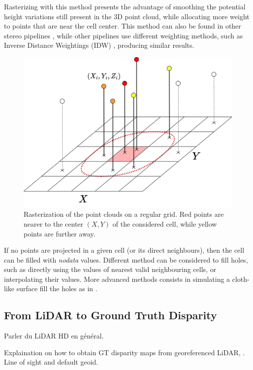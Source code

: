 Rasterizing with this method presents the advantage of smoothing the potential height variations still present in the 3D point cloud, while allocating more weight to points that are near the cell center. This method can also be found in other stereo pipelines \cite{shean_automated_2016}, while other pipelines use different weighting methods, such as Inverse Distance Weightings (IDW) \cite{rupnik_micmac_2017}, producing similar results.

\begin{figure}
    \centering
    \includegraphics[width=0.7\linewidth]{Images/Chap_1/Rasterization.png}
    \caption{Rasterization of the point clouds on a regular grid. Red points are nearer to the center $(X,Y)$ of the considered cell, while yellow points are further away.}
    \label{fig:rasterization}
\end{figure}

\begin{remark}
    If no points are projected in a given cell (or its direct neighbours), then the cell can be filled with \textit{nodata} values. Different method can be considered to fill holes, such as directly using the values of nearest valid neighbouring cells, or interpolating their values. More advanced methods consists in simulating a cloth-like surface fill the holes as in \cite{lallement_bulldozer_2022}.
\end{remark}

\subsection{From LiDAR to Ground Truth Disparity}
Parler du LiDAR HD en général. 

Explaination on how to obtain GT disparity maps from georeferenced LiDAR, \cite{cournet_ground_2020}. Line of sight and default geoid. 

